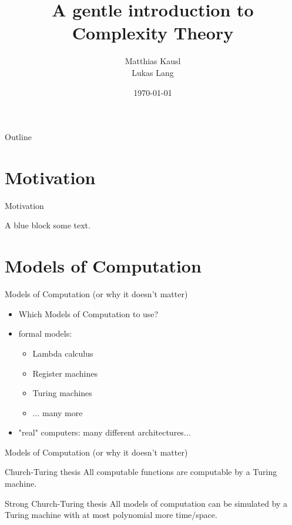 \documentclass[c]{beamer}
\title{A gentle introduction to Complexity Theory}
\author{Matthias Kausl \\ Lukas Lang}
\institute{Vienna University of Technology}
\date{\today}
\begin{document}
\begin{frame}
\titlepage
\end{frame}

\begin{frame}{Outline}
	\tableofcontents
\end{frame}

\section{Motivation}

\begin{frame}{Motivation}
          
	\begin{block}{A blue block}
		some text.
          \end{block}
\end{frame}

\section{Models of Computation}
\begin{frame}{Models of Computation (or why it doesn't matter)}
          \begin{itemize}
			\item Which Models of Computation to use?
			\item formal models:
			\begin{itemize}
				\item Lambda calculus
				\item Register machines
				\item Turing machines
				\item ... many more
			\end{itemize}
			\item "real" computers: many different architectures...
		  \end{itemize}
\end{frame}		

\begin{frame}{Models of Computation (or why it doesn't matter)}  
	\begin{block}{ Church-Turing thesis }
		All computable functions are computable by a Turing machine.
    \end{block}
    \begin{block}{ Strong Church-Turing thesis }
		All models of computation can be simulated by a Turing machine with at most polynomial more time/space.
    \end{block}
\end{frame}
\end{document}
